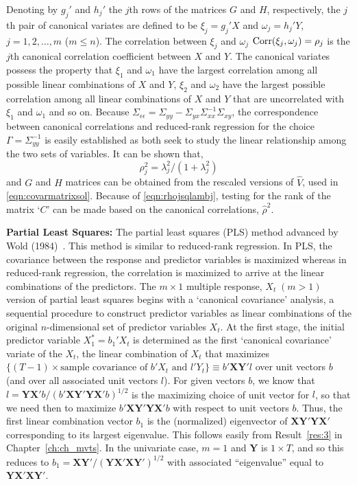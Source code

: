 Denoting by $g_j'$ and $h_j'$ the $j$th rows of the matrices $G$ and $H$, respectively, the $j$th pair of canonical variates are defined to be $\xi_j= g_j' X$ and $\omega_j= h_j' Y$, $j= 1, 2, \ldots, m$ ($m \leq n$). The correlation between $\xi_j$ and $\omega_j$ $\operatorname{Corr}(\xi_j, \omega_j)= \rho_j$ is the $j$th canonical correlation coefficient between $X$ and $Y$. The canonical variates possess the property that $\xi_1$ and $\omega_1$ have the largest correlation among all possible linear combinations of $X$ and $Y$, $\xi_2$ and $\omega_2$ have the largest possible correlation among all linear combinations of $X$ and $Y$ that are uncorrelated with $\xi_1$ and $\omega_1$ and so on. Because $\Sigma_{\epsilon\epsilon}= \Sigma_{yy} - \Sigma_{yx} \Sigma_{xx}^{-1} \Sigma_{xy}$, the correspondence between canonical correlations and reduced-rank regression for the choice $\Gamma= \Sigma_{yy}^{-1}$ is easily established as both seek to study the linear relationship among the two sets of variables. It can be shown that,
	\begin{equation} \label{eqn:rhojsqlambj}
	\rho_j^2= \lambda_j^2 / (1+\lambda_j^2)
	\end{equation}
and $G$ and $H$ matrices can be obtained from the rescaled versions of $\hat{V}$, used in \eqref{eqn:covarmatrixsol}. Because of \eqref{eqn:rhojsqlambj}, testing for the rank of the matrix `$C$' can be made based on the canonical correlations, $\hat{\rho}^2$. \twomedskip


\noindent\textbf{Partial Least Squares:} The partial least squares (PLS) method advanced by Wold (1984)~\cite{wold}. This method is similar to reduced-rank regression. In PLS, the covariance between the response and predictor variables is maximized whereas in reduced-rank regression, the correlation is maximized to arrive at the linear combinations of the predictors. The $m \times 1$ multiple response, $X_t \;(m>1)$ version of partial least squares begins with a `canonical covariance' analysis, a sequential procedure to construct predictor variables as linear combinations of the original $n$-dimensional set of predictor variables $X_t$. At the first stage, the initial predictor variable $X_{1}^*=b_1'X_t$ is determined as the first `canonical covariance' variate of the $X_t$, the linear combination of $X_t$ that maximizes $\{(T - 1) \times \text{sample covariance of } b'X_t \text{ and } l'Y_t \} \equiv b' \mathbf{XY}' l$ over unit vectors $b$ (and over all associated unit vectors $l$). For given vectors $b$, we know that $l=\mathbf{YX'} b/(b' \mathbf{XY'YX'}b)^{1/2}$ is the maximizing choice of unit vector for $l$, so that we need then to maximize $b' \mathbf{XY'YX'}b$ with respect to unit vectors $b$. Thus, the first linear combination vector $b_1$ is the (normalized) eigenvector of $\mathbf{XY'YX'}$ corresponding to its largest eigenvalue. This follows easily from Result~\ref{res:3} in Chapter~\ref{ch:ch_mvts}. In the univariate case, $m=1$ and $\mathbf{Y}$ is $1 \times T$, and so this reduces to $b_1=\mathbf{XY'}/(\mathbf{YX'XY'})^{1/2}$ with associated ``eigenvalue'' equal to $\mathbf{YX'XY'}$.


